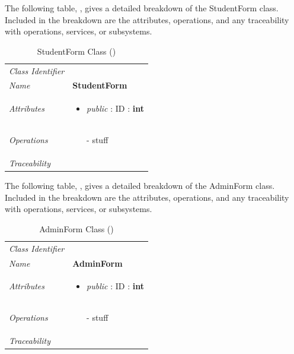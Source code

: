 \documentclass[12pt,letterpaper]{article}
\begin{document}
The following table, , gives a detailed breakdown of the StudentForm class. Included in the breakdown are the attributes, operations, and any traceability with operations, services, or subsystems.

\begin{table}[H]
    \caption{StudentForm Class ()} 
	\begin{tabu} to 
		\toprule
		Class Identifier &  \\
		Name & {\bf StudentForm} \\
		Attributes & 
		\begin{minipage}[t]{\linewidth}
		    \begin{itemize}
		        \item \textit{public} : ID : \bf{int}
			\end{itemize}
	    \end{minipage} \\

		Operations &
		\begin{minipage}[t]{\linewidth}
			\begin{enumerate}
			    \item[-] stuff
	        \end{enumerate}
	    \end{minipage} \\
	    	Traceability & \\
		\toprule
	\end{tabu}
\end{table}

The following table, , gives a detailed breakdown of the AdminForm class. Included in the breakdown are the attributes, operations, and any traceability with operations, services, or subsystems.

\begin{table}[H]
    \caption{AdminForm Class ()} 
	\begin{tabu} to 
		\toprule
		Class Identifier &  \\
		Name & {\bf AdminForm} \\
		Attributes & 
		\begin{minipage}[t]{\linewidth}
		    \begin{itemize}
		        \item \textit{public} : ID : \bf{int}
			\end{itemize}
	    \end{minipage} \\

		Operations &
		\begin{minipage}[t]{\linewidth}
			\begin{enumerate}
			    \item[-] stuff
	        \end{enumerate}
	    \end{minipage} \\
	    	Traceability & \\
		\toprule
	\end{tabu}
\end{table}
\end{document}
